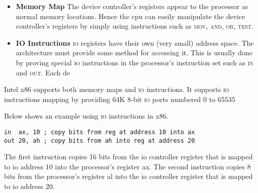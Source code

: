\begin{figure}[h]
\end{figure}


\begin{itemize}   
\renewcommand{\labelitemi}{$\Box$}
\item \textbf{Memory Map} 
The device controller’s registers appear to the processor as normal memory locations. 
Hence the cpu can easily manipulate the device controller’s registers by simply 
using instructions such as \textsc{mov}, \textsc{and}, \textsc{or}, \textsc{test}.
\item \textbf{IO Instructions} 
\textsc{io} registers have their own (very small) address space. 
The architecture must provide some method for accessing it. 
This is usually done by proving special \textsc{io} instructions in the processor's 
instruction set such as \textsc{in} and \textsc{out}. 
Each de
\end{itemize}

Intel x86 supports both memory maps and \textsc{io} instructions. 
It supports \textsc{io} instructions mapping by providing
64K 8-bit \textsc{io} ports numbered 0 to 65535





\frmrule

\begin{example}
Below shows an example using \textsc{io} instructions in x86.

\begin{lstlisting}
in  ax, 10 ; copy bits from reg at address 10 into ax
out 20, ah ; copy bits from ah into reg at address 20
\end{lstlisting}
The first instruction copies 16 bits from the io controller register
that is mapped to io address 10 into the processor's register ax. 
The second instruction copies 8 bits from the processor's register al
into the io controller register that is mapped to io address 20. 

\end{example}


